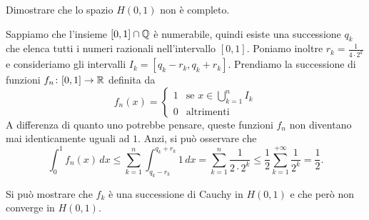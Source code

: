 \begin{example}
\label{ex:incompletezza_di_H}
Dimostrare che lo spazio $H(0,1)$ non è completo.

Sappiamo che l'insieme $[0,1]\cap \mathbb Q$ è numerabile, quindi esiste una
successione $q_k$ che elenca tutti i numeri razionali nell'intervallo $[0,1]$.
Poniamo inoltre $r_k = \frac{1}{4\cdot 2^k}$ e consideriamo gli intervalli
$I_k = [q_k-r_k,q_k+r_k]$.
Prendiamo la successione di funzioni $f_n\colon [0,1]\to \mathbb R$
definita da
\[
  f_n(x) =
  \begin{cases}
  1 &\text{se } x\in\displaystyle\bigcup_{k=1}^{n} I_k\\
  0 & \text{altrimenti}
  \end{cases}
\]
A differenza di quanto uno potrebbe pensare, queste funzioni $f_n$ non diventano
mai identicamente uguali ad $1$. Anzi, si può osservare che
\[
  \int_0^1 f_n(x)\, dx
  \le \sum_{k=1}^n \int_{q_k-r_k}^{q_k+r_k} 1\, dx
  = \sum_{k=1}^n \frac{1}{2\cdot 2^k}
  \le \frac{1}{2}\sum_{k=1}^{+\infty}\frac{1}{2^k} = \frac 1 2.
\]

Si può mostrare che $f_k$ è una successione di Cauchy in $H(0,1)$ e
che però non converge in $H(0,1)$.
\end{example}

